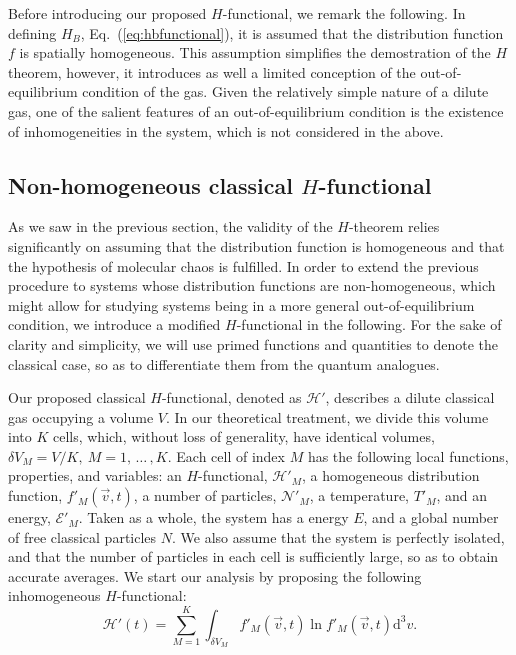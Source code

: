 Before introducing our proposed $H$-functional, we remark the following. In defining
$H_B$, Eq.~(\ref{eq:hbfunctional}), it is assumed that the distribution function 
$f$ is spatially homogeneous. This assumption simplifies the demostration 
of the $H$ theorem, however, it introduces as well a limited conception
of the out-of-equilibrium condition of the gas. Given the relatively simple nature of a dilute 
gas, one of the salient features of an out-of-equilibrium condition is the existence of
inhomogeneities in the system, which is not considered in the above.

\subsection{Non-homogeneous classical $H$-functional}

As we saw in the previous section,
the validity of the $H$-theorem relies significantly on assuming
that the distribution function is homogeneous and that the hypothesis of
molecular chaos is fulfilled. In order to extend the previous procedure to systems whose
distribution functions are non-homogeneous, which might allow for studying systems
being in a more general out-of-equilibrium condition, we introduce a modified $H$-functional 
in the following. For the sake of clarity and simplicity, we will use primed functions
and quantities to denote the classical case, so as to differentiate them from the quantum
analogues.

Our proposed classical $H$-functional, denoted as $\mathcal{H}'$, describes a dilute classical
gas occupying a volume $V$. In our theoretical treatment, we divide this volume
into $K$ cells, which, without loss of generality,
have identical volumes, $\delta V_M = V/K,\ M=1,\,\dots\,,K$.
Each cell of index $M$ has the following local functions, properties, and variables:
an $H$-functional, $\mathcal{H}'_M$, a homogeneous distribution function, $f'_{M}(\vec{v},t)$,
a number of particles, $\mathcal{N}'_M$, a temperature, $T'_M$, and an
energy, $\mathcal{E}'_M$. Taken as a whole, the system has a
energy $E$, and a global number of free classical particles $N$. We also assume that the system is 
perfectly isolated, and that the number of particles
in each cell is sufficiently large, so as to obtain accurate averages.
We start our analysis by proposing the following inhomogeneous $H$-functional:
%
\begin{equation}\label{eq:cHdef}
   \mathcal{H}'(t)=\sum_{M=1}^{K}\int_{\delta V_M} f'_M(\vec{v},t) \ln f'_M(\vec{v},t)\mathrm{d}^3v.
\end{equation}
%



